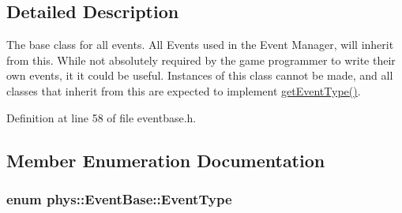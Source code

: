 \subsection{Detailed Description}
The base class for all events. All Events used in the Event Manager, will inherit from this. While not absolutely required by the game programmer to write their own events, it it could be useful. Instances of this class cannot be made, and all classes that inherit from this are expected to implement \hyperlink{classphys_1_1EventBase_a0f39a25f4b64f7cf701e174454616366}{getEventType()}. 

Definition at line 58 of file eventbase.h.



\subsection{Member Enumeration Documentation}
\hypertarget{classphys_1_1EventBase_a5e6a8564e127f654123f0bf6a2751923}{
\subsubsection[{EventType}]{\setlength{\rightskip}{0pt plus 5cm}enum {\bf phys::EventBase::EventType}}}
\label{dd/d80/classphys_1_1EventBase_a5e6a8564e127f654123f0bf6a2751923}
